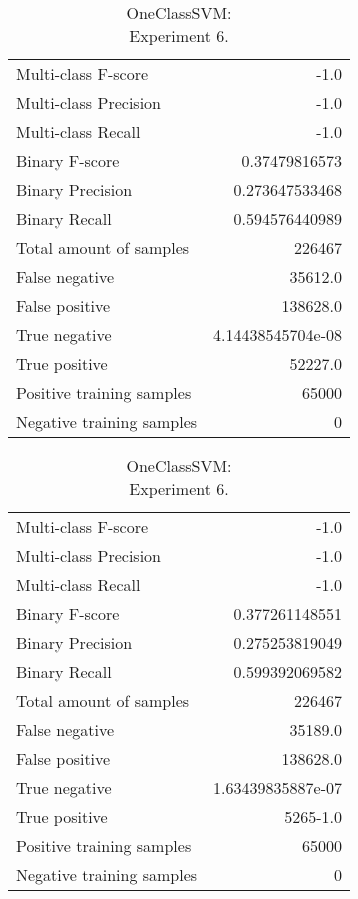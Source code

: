 \begin{table}[H]
\begin{minipage}{0.5\textwidth}

\caption{OneClassSVM: \\Experiment 5.}

\centering
\begin{tabular}{l r}
\toprule
Multi-class F-score & -1.0 \\
Multi-class Precision & -1.0 \\
Multi-class Recall & -1.0 \\
\midrule
Binary F-score & 0.37479816573 \\
Binary Precision & 0.273647533468 \\
Binary Recall & 0.594576440989 \\
\midrule
Total amount of samples & 226467 \\
False negative & 35612.0 \\
False positive & 138628.0 \\
True negative & 4.14438545704e-08 \\
True positive & 52227.0 \\
\midrule
Positive training samples & 65000 \\
Negative training samples & 0 \\
\bottomrule
\end{tabular}

\end{minipage}
\hfillx
\begin{minipage}{0.5\textwidth}
\caption{OneClassSVM: \\Experiment 6.}

\centering
\begin{tabular}{l r}
\toprule
Multi-class F-score & -1.0 \\
Multi-class Precision & -1.0 \\
Multi-class Recall & -1.0 \\
\midrule
Binary F-score & 0.377261148551 \\
Binary Precision & 0.275253819049 \\
Binary Recall & 0.599392069582 \\
\midrule
Total amount of samples & 226467 \\
False negative & 35189.0 \\
False positive & 138628.0 \\
True negative & 1.63439835887e-07 \\
True positive & 5265-1.0 \\
\midrule
Positive training samples & 65000 \\
Negative training samples & 0 \\
\bottomrule
\end{tabular}
\end{minipage}
\end{table}
